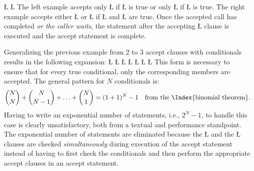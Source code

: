 \documentclass[openright,twoside]{report}
\begin{document}
\LGinlinefalse\LGbegin\lgrinde
\L{}
\L{}
\endlgrinde\LGend
The left example accepts only \LGinlinetrue\LGbegin\lgrinde\L{}\endlgrinde\LGend{} if \LGinlinetrue\LGbegin\lgrinde\L{}\endlgrinde\LGend{} is true or only \LGinlinetrue\LGbegin\lgrinde\L{}\endlgrinde\LGend{} if \LGinlinetrue\LGbegin\lgrinde\L{}\endlgrinde\LGend{} is true.
The right example accepts either \LGinlinetrue\LGbegin\lgrinde\L{}\endlgrinde\LGend{} or \LGinlinetrue\LGbegin\lgrinde\L{}\endlgrinde\LGend{} if \LGinlinetrue\LGbegin\lgrinde\L{}\endlgrinde\LGend{} and \LGinlinetrue\LGbegin\lgrinde\L{}\endlgrinde\LGend{} are true.
Once the accepted call has completed \emph{or the caller waits}, the statement after the accepting \LGinlinetrue\LGbegin\lgrinde\L{}\endlgrinde\LGend{} clause is executed and the accept statement is complete.

\begin{annotation}
\label{p:ExponentialExpansion}
Generalizing the previous example from 2 to 3 accept clauses with conditionals results in the following expansion:
\LGinlinefalse\LGbegin\lgrinde
\L{}
\L{}
\L{}
\L{}
\L{}
\L{}
\L{}
\endlgrinde\LGend
This form is necessary to ensure that for every true conditional, only the corresponding members are accepted.
The general pattern for $N$ conditionals is:
\[
{N \choose N} + {N \choose N - 1} + \ldots + {N \choose 1} = ( 1 + 1 ) ^ N - 1 \quad \mbox{from the \Index{binomial theorem}}.
\]
Having to write an exponential number of statements, i.e., $2^{N}-1$, to handle this case is clearly unsatisfactory, both from a textual and performance standpoint.
The exponential number of statements are eliminated because the \LGinlinetrue\LGbegin\lgrinde\L{}\endlgrinde\LGend{} and the \LGinlinetrue\LGbegin\lgrinde\L{}\endlgrinde\LGend{} clauses are checked \emph{simultaneously} during execution of the accept statement instead of having to first check the conditionals and then perform the appropriate accept clauses in an accept statement.
\end{annotation}
\end{document}
